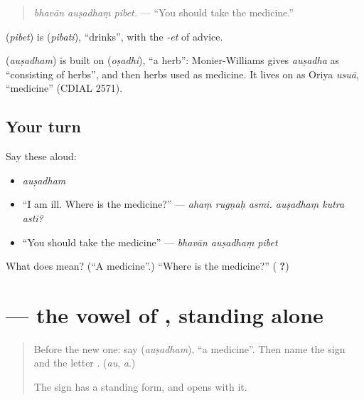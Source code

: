 \begin{quote}
\emph{bhavān auṣadhaṃ pibet.} — \textquotedblleft{}You should take the medicine.\textquotedblright{}
\end{quote}

\textbf{} (\emph{pibet}) is \textbf{} (\emph{pibati}), \textquotedblleft{}drinks\textquotedblright{}, with the \emph{-et} of advice.

\begin{cousinweb}
\textbf{} (\emph{auṣadham}) is built on \textbf{} (\emph{oṣadhi}), \textquotedblleft{}a herb\textquotedblright{}: Monier-Williams gives \emph{auṣadha} as \textquotedblleft{}consisting of herbs\textquotedblright{}, and then herbs used as medicine. It lives on as Oriya \emph{usuā}, \textquotedblleft{}medicine\textquotedblright{} (CDIAL 2571).
\end{cousinweb}

\subsection*{Your turn}
Say these aloud:

\begin{itemize}
\raggedright
  \item \emph{auṣadham}
  \item \textquotedblleft{}I am ill. Where is the medicine?\textquotedblright{} — \emph{ahaṃ rugṇaḥ asmi. auṣadhaṃ kutra asti?}
  \item \textquotedblleft{}You should take the medicine\textquotedblright{} — \emph{bhavān auṣadhaṃ pibet}
\end{itemize}

\begin{tcolorbox}[breakable,colback=teal!4,colframe=teal!35!black,title={Before you move on}]
What does \textbf{} mean? (\textquotedblleft{}A medicine\textquotedblright{}.) \textquotedblleft{}Where is the medicine?\textquotedblright{} (\textbf{  ?})
\end{tcolorbox}
\section[\texorpdfstring{\sk{औ} (au)}{औ (au)}]{ — the vowel of , standing alone}

\label{lesson:SA-S228-letter-au}



\begin{quote}
Before the new one: say \textbf{} (\emph{auṣadham}), \textquotedblleft{}a medicine\textquotedblright{}. Then name the sign \textbf{} and the letter \textbf{}. (\emph{au}, \emph{a}.)

The sign \textbf{} has a standing form, and \textbf{} opens with it.
\end{quote}

